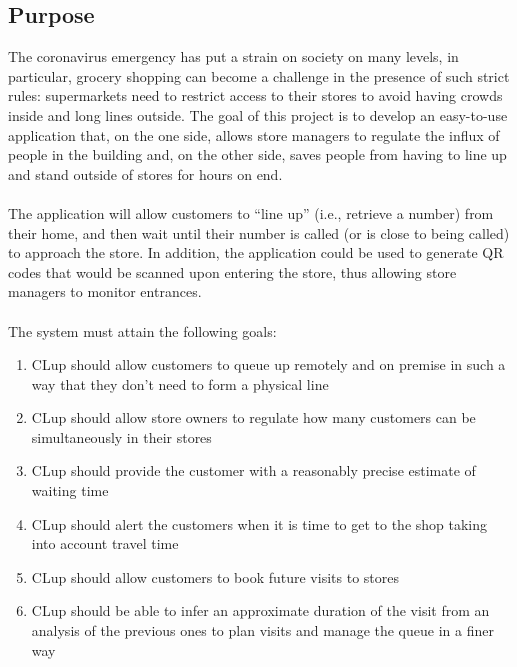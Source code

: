 \subsection{Purpose}
The coronavirus emergency has put a strain on society on many levels, in  particular,  grocery  shopping can  become  a  challenge  in  the presence  of  such  strict  rules: supermarkets  need to  restrict  access  to  their  stores  to  avoid having  crowds  inside and long  lines outside. The  goal  of  this  project  is  to  develop  an  easy-to-use  application  that,  on  the  one  side,  allows  store managers  to  regulate  the  influx  of  people  in  the  building  and,  on  the  other  side,  saves  people  from having to line up and stand outside of stores for hours on end. \\\\
The application will allow customers to “line up” (i.e., retrieve a number) from their home, and then wait  until  their  number  is  called  (or  is  close  to  being  called)  to  approach  the  store.  In  addition,  the application could be used to generate QR codes that would be scanned upon entering the store, thus allowing store managers to monitor entrances.\\\\
The system must attain the following goals:

\begin{enumerate}[label=G\arabic*]
	\item CLup should allow customers to queue up remotely and on premise in such a way that they don't need to form a physical line
	\item CLup should allow store owners to regulate how many customers can be simultaneously in their stores
	\item CLup should provide the customer with a reasonably precise estimate of waiting time
	\item CLup should alert the customers when it is time to get to the shop taking into account travel time
	\item CLup should allow customers to book future visits to stores
	\item CLup should be able to infer an approximate duration of the visit from an analysis of the previous ones to plan visits and manage the queue in a finer way
\end{enumerate}


